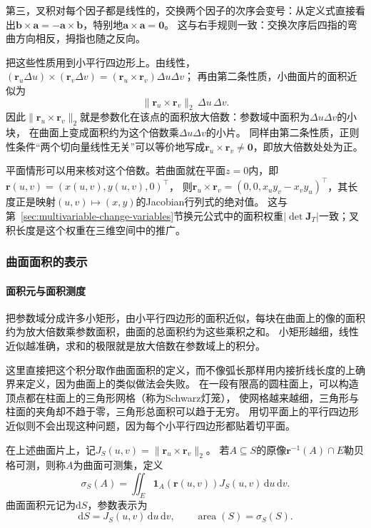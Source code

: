第三，叉积对每个因子都是线性的，交换两个因子的次序会变号：从定义式直接看出$\bm b\times\bm a=-\bm a\times\bm b$，特别地$\bm a\times\bm a=\bm0$。
这与右手规则一致：交换次序后四指的弯曲方向相反，拇指也随之反向。

把这些性质用到小平行四边形上。由线性，
$(\bm r_u\Delta u)\times(\bm r_v\Delta v)=(\bm r_u\times\bm r_v)\Delta u\Delta v$；
再由第二条性质，小曲面片的面积近似为
\[
 \lVert\bm r_u\times\bm r_v\rVert_2\,\Delta u\,\Delta v.
\]
因此$\lVert\bm r_u\times\bm r_v\rVert_2$就是参数化在该点的面积放大倍数：参数域中面积为$\Delta u\Delta v$的小块，
在曲面上变成面积约为这个倍数乘$\Delta u\Delta v$的小片。
同样由第二条性质，正则性条件“两个切向量线性无关”可以等价地写成$\bm r_u\times\bm r_v\ne\bm0$，即放大倍数处处为正。

平面情形可以用来核对这个倍数。若曲面就在平面$z=0$内，即$\bm r(u,v)=(x(u,v),y(u,v),0)^\top$，
则$\bm r_u\times\bm r_v=(0,0,x_uy_v-x_vy_u)^\top$，其长度正是映射$(u,v)\mapsto(x,y)$的Jacobian行列式的绝对值。
这与第~\ref{sec:multivariable-change-variables}节换元公式中的面积权重$|\det\bm J_T|$一致；叉积长度是这个权重在三维空间中的推广。

\subsubsection{曲面面积的表示}

\paragraph{面积元与面积测度}

把参数域分成许多小矩形，由小平行四边形的面积近似，每块在曲面上的像的面积约为放大倍数乘参数面积，曲面的总面积约为这些乘积之和。
小矩形越细，线性近似越准确，求和的极限就是放大倍数在参数域上的积分。

这里直接把这个积分取作曲面面积的定义，而不像弧长那样用内接折线长度的上确界来定义，因为曲面上的类似做法会失败。
在一段有限高的圆柱面上，可以构造顶点都在柱面上的三角形网格（称为Schwarz灯笼），
使网格越来越细，三角形与柱面的夹角却不趋于零，三角形总面积可以趋于无穷。
用切平面上的平行四边形近似则不会出现这种问题，因为每个小平行四边形都贴着切平面。

\begin{definition}[曲面面积测度]
\label{def:analysis-surface-area-measure}
在上述曲面片上，记$J_S(u,v)=\lVert\bm r_u\times\bm r_v\rVert_2$。
若$A\subseteq S$的原像$\bm r^{-1}(A)\cap E$勒贝格可测，则称$A$为曲面可测集，定义
\[
 \sigma_S(A)=\iint_E\bm1_A(\bm r(u,v))J_S(u,v)\,\mathrm du\,\mathrm dv.
\]
曲面面积元记为$\mathrm dS$，参数表示为
\[
 \mathrm dS=J_S(u,v)\,\mathrm du\,\mathrm dv,
 \qquad \operatorname{area}(S)=\sigma_S(S).
\]
\end{definition}

